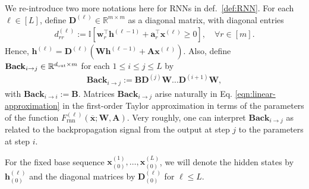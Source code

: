We re-introduce two more notations here for RNNs in def.~\ref{def:RNN}. For each $\ell \in [L]$, define $\mathbf{D}^{(\ell)} \in \mathbb{R}^{m \times m}$ as a diagonal matrix, with diagonal entries 
\begin{align}\label{eqn:diagonal}
	d_{rr}^{(\ell)} := \mathbb{I}[\mathbf{w}_r^{\top} \mathbf{h}^{(\ell - 1)} + \mathbf{a}_r^{\top} \mathbf{x}^{(\ell)} \ge 0], \quad \forall r \in [m]. 
\end{align}
Hence, $\mathbf{h}^{(\ell)} = \mathbf{D}^{(\ell)} (\mathbf{W} \mathbf{h}^{(\ell-1)} + \mathbf{A} \mathbf{x}^{(\ell)})$. Also, define $\mathbf{Back}_{i \to j} \in \mathbb{R}^{d_{\mathrm{out}}  \times m}$ for each $1 \le i \le j \le L$ by
\begin{align*}
	\mathbf{Back}_{i \to j} := \mathbf{B} \mathbf{D}^{(j)} \mathbf{W} \ldots \mathbf{D}^{(i+1)} \mathbf{W}, 
\end{align*}
with $\mathbf{Back}_{i \to i} := \mathbf{B}$. Matrices $\mathbf{Back}_{i \to j}$ arise naturally in Eq. \eqref{eqn:linear-approximation} in the first-order Taylor approximation in terms of the parameters of the function $F_{\mathrm{rnn}}^{(\ell)}(\overline{\mathbf{x}} ; \mathbf{W}, \mathbf{A})$. Very roughly, one can interpret $\mathbf{Back}_{i \to j}$ as related to the backpropagation signal from the output at step $j$ to the parameters at step $i$. 

For the fixed base sequence $\mathbf{x}^{(1)}_{(0)}, \ldots, \mathbf{x}^{(L)}_{(0)}$, we will denote the hidden states by $\mathbf{h}^{(\ell)}_{(0)}$ and the diagonal matrices by $\mathbf{D}^{(\ell)}_{(0)}$ for $\ell \le L$.



